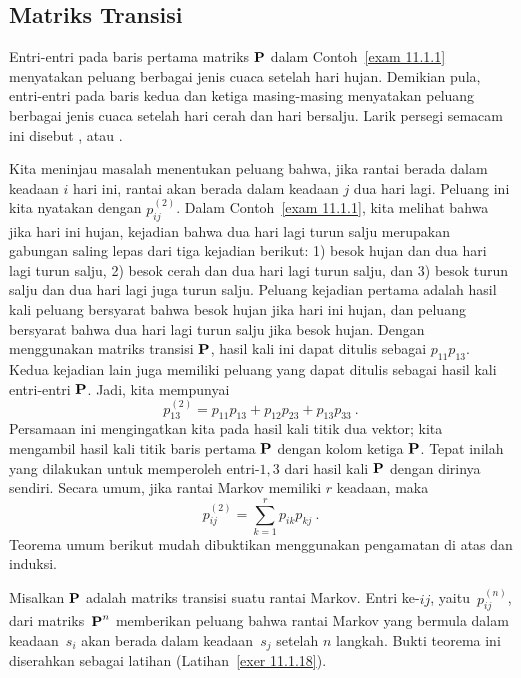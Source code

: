 \subsection*{Matriks Transisi}
Entri-entri pada baris pertama matriks ${\mbox{\bf P}\/}$ dalam Contoh~\ref{exam
11.1.1} menyatakan peluang berbagai jenis cuaca setelah hari hujan. Demikian
pula, entri-entri pada baris kedua dan ketiga masing-masing menyatakan peluang
berbagai jenis cuaca setelah hari cerah dan hari bersalju. Larik persegi semacam
ini disebut , atau .
\par
Kita meninjau masalah menentukan peluang bahwa, jika rantai berada dalam
keadaan $i$ hari ini, rantai akan berada dalam keadaan $j$ dua hari lagi.
Peluang ini kita nyatakan dengan $p_{ij}^{(2)}$. Dalam
Contoh~\ref{exam 11.1.1}, kita melihat bahwa jika hari ini hujan, kejadian bahwa
dua hari lagi turun salju merupakan gabungan saling lepas dari tiga kejadian
berikut: 1) besok hujan dan dua hari lagi turun salju, 2) besok cerah dan dua
hari lagi turun salju, dan 3) besok turun salju dan dua hari lagi juga turun
salju. Peluang kejadian pertama adalah hasil kali peluang bersyarat bahwa besok
hujan jika hari ini hujan, dan peluang bersyarat bahwa dua hari lagi turun
salju jika besok hujan. Dengan menggunakan matriks transisi ${\mbox{\bf P}\/}$, hasil
kali ini dapat ditulis sebagai $p_{11}p_{13}$. Kedua kejadian lain juga
memiliki peluang yang dapat ditulis sebagai hasil kali entri-entri ${\mbox{\bf P}\/}$.
Jadi, kita mempunyai
$$p_{13}^{(2)} = p_{11}p_{13} + p_{12}p_{23} + p_{13}p_{33}\ .$$
Persamaan ini mengingatkan kita pada hasil kali titik dua vektor; kita mengambil
hasil kali titik baris pertama $ {\mbox{\bf P}\/}$ dengan kolom ketiga $ {\mbox{\bf P}\/}$.
Tepat inilah yang dilakukan untuk memperoleh entri-$1,3$ dari hasil kali $ {\mbox{\bf P}\/}$ dengan dirinya sendiri. Secara umum, jika rantai Markov memiliki $r$
keadaan, maka
$$p_{ij}^{(2)} = \sum_{k = 1}^r p_{ik}p_{kj}\ .$$
Teorema umum berikut mudah dibuktikan menggunakan pengamatan di atas dan induksi.
\begin{theorem}\label{thm 11.1.1}
Misalkan $ {\mbox{\bf P}\/}$ adalah matriks transisi suatu rantai Markov. Entri
ke-$ij$, yaitu~$p_{ij}^{(n)}$, dari matriks~$ {\mbox{\bf P}\/}^n$ memberikan peluang
bahwa rantai Markov yang bermula dalam keadaan~$s_i$ akan berada dalam
keadaan~$s_j$ setelah $n$ langkah.
\proof
Bukti teorema ini diserahkan sebagai latihan (Latihan~\ref{exer 11.1.18}).
\end{theorem}

